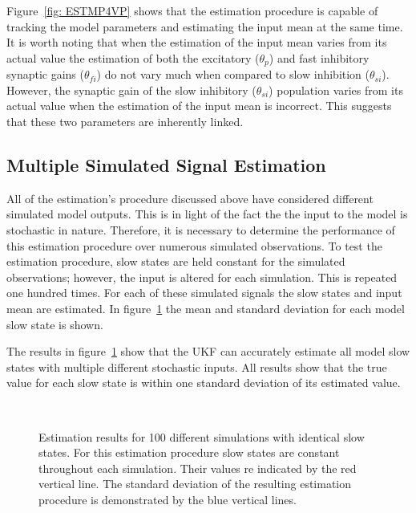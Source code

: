 Figure~\ref{fig: ESTMP4VP} shows that the estimation procedure is capable of tracking the model parameters and estimating the input mean at the same time. It is worth noting that when the estimation of the input mean varies from its actual value the estimation of both the excitatory ($\theta_{p}$) and fast inhibitory synaptic gains ($\theta_{fi}$) do not vary much when compared to slow inhibition ($\theta_{si}$). However, the synaptic gain of the slow inhibitory ($\theta_{si}$) population varies from its actual value when the estimation of the input mean is incorrect. This suggests that these two parameters are inherently linked. 



\subsection{Multiple Simulated Signal Estimation}
\label{ssec: MSSE}

All of the estimation's procedure discussed above have considered different simulated model outputs. This is in light of the fact the the input to the model is stochastic in nature. Therefore, it is necessary to determine the performance of this estimation procedure over numerous simulated observations. To test the estimation procedure, slow states are held constant for the simulated observations; however, the input is altered for each simulation. This is repeated one hundred times. For each of these simulated signals the slow states and input mean are estimated. In figure~\ref{fig: MultiSim} the mean and standard deviation for each model slow state is shown. 

The results in figure~\ref{fig: MultiSim} show that the UKF can accurately estimate all model slow states with multiple different stochastic inputs. All results show that the true value for each slow state is within one standard deviation of its estimated value.

\begin{figure}[ht]
\centering
{}
\\
\caption{Estimation results for 100 different simulations with identical slow states. For this estimation procedure slow states are constant throughout each simulation. Their values re indicated by the red vertical line. The standard deviation of the resulting estimation procedure is demonstrated by the blue vertical lines.}
\label{fig: MultiSim}
\end{figure}

